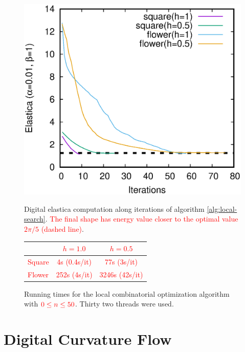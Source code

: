 \documentclass[smallextended]{svjour3}       %
\newcommand{\revision}[1]{\textcolor{red}{#1}}
\begin{document}
\begin{figure}[!h]
\begin{minipage}[b]{0.5\textwidth}
\center
\includegraphics[scale=0.35]{images/local_search/square-flower.eps}
\caption{Digital elastica computation along iterations of algorithm \ref{alg:local-search}. \revision{The final shape has energy value closer to the optimal value $2\pi/5$ (dashed line)}.}
\label{fig:plot-elastica-local-search}
\end{minipage}\hspace{40pt}%
\begin{minipage}[b]{0.45\textwidth}
\revision{
\center
\captionsetup{type=table}
\begin{tabular}{|l|c|c|}
\hline
& $h=1.0$ & $h=0.5$\\
\hline
Square & 4s (0.4s/it) & 77s (3s/it)\\
\hline
Flower & 252s (4s/it)  & 3246s (42s/it)\\
\hline
\end{tabular}
}
\caption{Running times for the local combinatorial optimization algorithm with $\revision{ 0 \leq n \leq 50}$. Thirty two threads were used.}
\label{tab:summary-local-comb-rtime}
\end{minipage}
\end{figure}

\section{Digital Curvature Flow}
\end{document}
